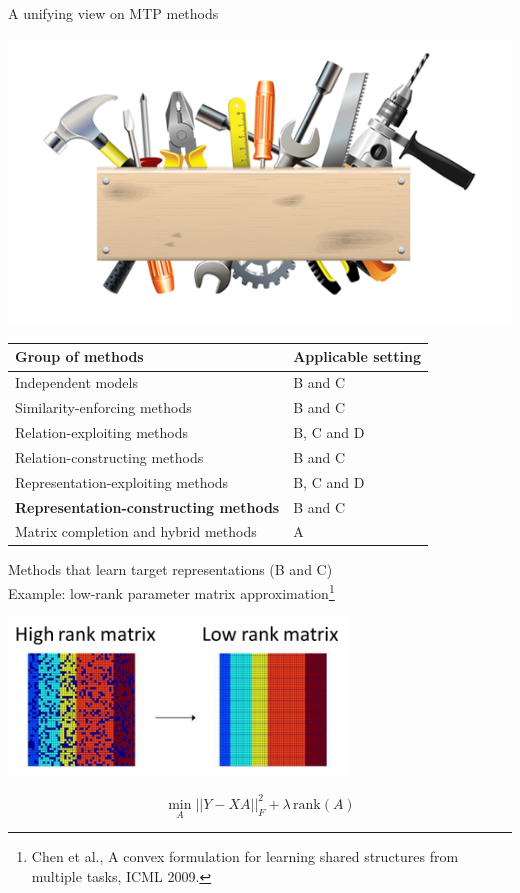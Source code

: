 \documentclass[]{beamer}
\renewcommand{\alert}[1]{\textbf{\color{putblue} #1}}
\begin{document}
\begin{frame}{A unifying view on MTP methods}

\begin{center}
\includegraphics[scale=0.3]{pics/tools}

\begin{tabular}{ll}
\hline
Group of methods & Applicable setting \\
\hline
\hline
Independent models & B and C \\
Similarity-enforcing methods & B and C   \\ 
Relation-exploiting methods & B, C and D  \\
Relation-constructing methods & B and C \\
Representation-exploiting methods & B, C and D \\
\alert{Representation-constructing methods} & B and C \\
Matrix completion and hybrid methods & A \\
\hline  
\end{tabular}
\end{center}
\end{frame}

\begin{frame}{Methods that learn target representations (B and C) \\
Example: low-rank parameter matrix approximation\footnote{Chen et al., A convex formulation for learning shared structures from
multiple tasks, ICML 2009. }}

\begin{center}
\includegraphics[width=9cm]{pics/lowrank}
\end{center}

$$\min_A ||Y - XA ||^2_F + \lambda \, \mathrm{rank}(A)$$

\end{frame}
\end{document}
